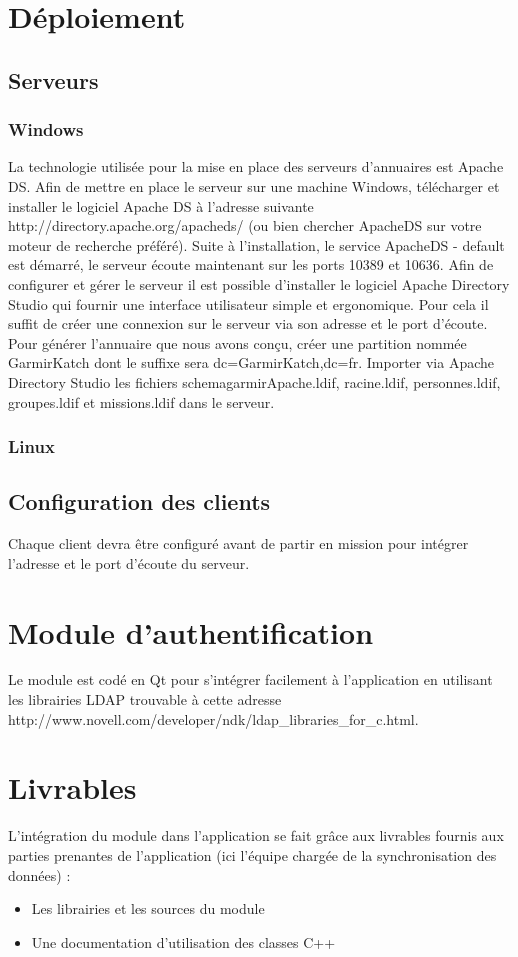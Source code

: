 \documentclass[11pt,fleqn]{report}
\begin{document}
\chapter{Déploiement}
\section{Serveurs}
\subsection{Windows}
La technologie utilisée pour la mise en place des serveurs d’annuaires est Apache DS. Afin de mettre en place le serveur sur une machine Windows, télécharger et installer le logiciel Apache DS à l’adresse suivante http://directory.apache.org/apacheds/ (ou bien chercher ApacheDS sur votre moteur de recherche préféré). Suite à l’installation, le service ApacheDS - default est démarré, le serveur écoute maintenant sur les ports 10389 et 10636.
Afin de configurer et gérer le serveur il est possible d’installer le logiciel Apache Directory Studio qui fournir une interface utilisateur simple et ergonomique. Pour cela il suffit de créer une connexion sur le serveur via son adresse et le port d’écoute.
Pour générer l’annuaire que nous avons conçu, créer une partition nommée GarmirKatch dont le suffixe sera dc=GarmirKatch,dc=fr. Importer via Apache Directory Studio les fichiers schemagarmirApache.ldif, racine.ldif, personnes.ldif, groupes.ldif et missions.ldif dans le serveur.
\subsection{Linux}

\section{Configuration des clients}
Chaque client devra être configuré avant de partir en mission pour intégrer l’adresse et le port d’écoute du serveur. 
\chapter{Module d'authentification}
Le module est codé en Qt pour s’intégrer facilement à l’application en utilisant les librairies LDAP trouvable à cette adresse http://www.novell.com/developer/ndk/ldap\_libraries\_for\_c.html.
\chapter{Livrables}
L’intégration du module dans l’application se fait grâce aux livrables fournis aux parties prenantes de l’application (ici l’équipe chargée de la synchronisation des données) :
\begin{itemize}
\item Les librairies et les sources du module
\item Une documentation d’utilisation des classes C++
\end{itemize}
\end{document}
